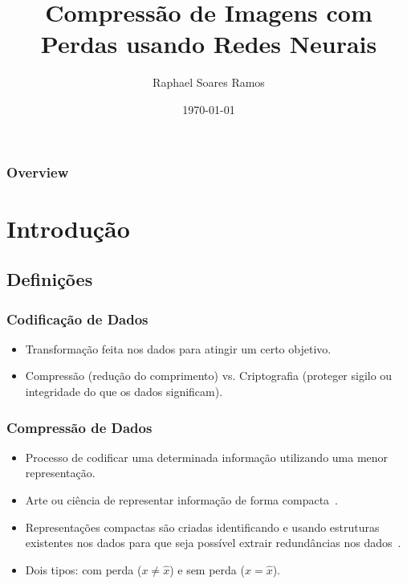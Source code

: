 \documentclass{beamer}
\title[Trabalho de Graduação 1]{Compressão de Imagens com Perdas usando Redes Neurais} %
\author[Raphael Soares Ramos]{Raphael Soares Ramos} %
\institute[UnB] %
{
Universidade de Brasília \\ %
\medskip
\textit{raphael.soares@nubank.com.br} %
}
\date{\today} %
\begin{document}
\begin{frame}
\titlepage %
\end{frame}

\begin{frame}[allowframebreaks]
\frametitle{Overview} %
\tableofcontents %
\end{frame}


\section{Introdução}
\subsection{Definições}
\begin{frame}
\frametitle{Codificação de Dados}
\begin{itemize}
\item Transformação feita nos dados para atingir um certo objetivo.
\item Compressão (redução do comprimento) vs. Criptografia (proteger sigilo ou integridade do que os dados significam).
\end{itemize}
\end{frame}
\begin{frame}
\frametitle{Compressão de Dados}
\begin{itemize}
\item Processo de codificar uma determinada informação utilizando uma menor representação.
\item Arte ou ciência de representar informação de forma compacta~\cite{book_compression}.
\item Representações compactas são criadas identificando e usando estruturas existentes nos dados para que seja possível extrair redundâncias nos dados~\cite{book_compression}.
\item Dois tipos: com perda ($x \neq \hat{x}$) e sem perda ($x = \hat{x}$).
\end{itemize}
\end{frame}
\end{document}
